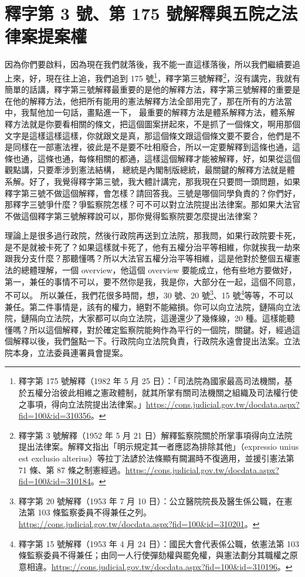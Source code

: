 \section{釋字第 3 號、第 175 號解釋與五院之法律案提案權}

\hypertarget{c08:cue:121}{}因為你們要啟料，因為現在我們就落後，我不能一直這樣落後，所以我們繼續要追上來，好，現在往上追，我們追到 175 號\footnote{釋字第 175 號解釋（1982 年 5 月 25 日）：「司法院為國家最高司法機關，基於五權分治彼此相維之憲政體制，就其所掌有關司法機關之組織及司法權行使之事項，得向立法院提出法律案。」\url{https://cons.judicial.gov.tw/docdata.aspx?fid=100&id=310356}。}，釋字第三號解釋\footnote{釋字第 3 號解釋（1952 年 5 月 21 日）解釋監察院關於所掌事項得向立法院提出法律案。解釋文指出「明示規定其一者應認為排除其他」（expressio unius est exclusio alterius）等拉丁法諺於法條顯有闕漏時不復適用，並援引憲法第 71 條、第 87 條之制憲經過。\url{https://cons.judicial.gov.tw/docdata.aspx?fid=100&id=310184}。}，沒有講完，我就有簡單的話講，釋字第三號解釋最重要的是他的解釋方法，釋字第三號解釋的重要是在他的解釋方法，他把所有能用的憲法解釋方法全部用完了，那在所有的方法當中，我幫他加一句話，畫點進一下，
\hypertarget{c08:cue:122}{}最重要的解釋方法是體系解釋方法，體系解釋方法就是你要看相關的條文，把這個圖案拼起來，不是抓了一個條文，啊用那個文字是這樣這樣這樣，你就跟文是真，那這個條文跟這個條文要不要合，他們是不是同樣在一部憲法裡，彼此是不是要不吐相廢合，所以一定要解釋到這條也通，這條也通，這條也通，每條相關的都通，這樣這個解釋才能被解釋，好，如果從這個觀點講，只要牽涉到憲法結構，
\hypertarget{c08:cue:123}{}總統是內閣制版總統，最關鍵的解釋方法就是體系解。好了，我覺得釋字第三號，我大體計講完，那我現在只要問一頭問題，如果釋字第三號不做這個解釋，會怎樣？請回答我。三號是哪個同學負責的？你們好，那釋字三號爭什麼？爭監察院怎樣？可不可以對立法院提出法律案。那如果大法官不做這個釋字第三號解釋說可以，那你覺得監察院要怎麼提出法律案？

\hypertarget{c08:cue:124}{}理論上是很多過行政院，然後行政院再送到立法院，那我問，如果行政院要卡死，是不是就被卡死了？如果這樣就卡死了，他有五權分治平等相維，你就挨我一劫來跟我分支什麼？那聽懂嗎？所以大法官五權分治平等相維，這是他對於整個五權憲法的總體理解，一個 overview，他這個 overview 要能成立，他有些地方要做好，第一，兼任的事情不可以，要不然你是我，我是你，大部分在一起，這個不同意，不可以。
\hypertarget{c08:cue:125}{}所以兼任，我們花很多時間，想，30 號、20 號\footnote{釋字第 20 號解釋（1953 年 7 月 10 日）：公立醫院院長及醫生係公職，在憲法第 103 條監察委員不得兼任之列。\url{https://cons.judicial.gov.tw/docdata.aspx?fid=100&id=310201}。}、15 號\footnote{釋字第 15 號解釋（1953 年 4 月 24 日）：國民大會代表係公職，依憲法第 103 條監察委員不得兼任；由同一人行使彈劾權與罷免權，與憲法劃分其職權之原意相違。\url{https://cons.judicial.gov.tw/docdata.aspx?fid=100&id=310196}。}等等，不可以兼任。第二件事情是，該有的權力，絕對不能縮損。你可以向立法院，鏈隔向立法院，鏈隔向立法院，大家都可以向立法院，這邊還少了幾條線，20 種。這樣能聽懂嗎？所以這個解釋，對於確定監察院能夠作為平行的一個院，關鍵。好，經過這個解釋以後，我們盤點一下。行政院向立法院負責，行政院永遠會提出法案。立法院本身，立法委員連署員會提案。

